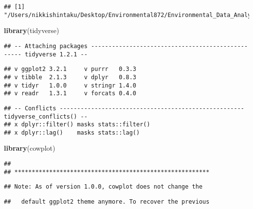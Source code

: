 \documentclass[]{article}
\newenvironment{Shaded}{\begin{snugshade}}{\end{snugshade}}
\newcommand{\CommentTok}[1]{\textcolor[rgb]{0.56,0.35,0.01}{\textit{#1}}}
\newcommand{\KeywordTok}[1]{\textcolor[rgb]{0.13,0.29,0.53}{\textbf{#1}}}
\newcommand{\NormalTok}[1]{#1}
\begin{document}
\begin{Shaded}
\end{Shaded}

\begin{verbatim}
## [1] "/Users/nikkishintaku/Desktop/Environmental872/Environmental_Data_Analytics_2020"
\end{verbatim}

\begin{Shaded}
\begin{Highlighting}[]
\KeywordTok{library}\NormalTok{(tidyverse)}
\end{Highlighting}
\end{Shaded}

\begin{verbatim}
## -- Attaching packages -------------------------------------------------- tidyverse 1.2.1 --
\end{verbatim}

\begin{verbatim}
## v ggplot2 3.2.1     v purrr   0.3.3
## v tibble  2.1.3     v dplyr   0.8.3
## v tidyr   1.0.0     v stringr 1.4.0
## v readr   1.3.1     v forcats 0.4.0
\end{verbatim}

\begin{verbatim}
## -- Conflicts ----------------------------------------------------- tidyverse_conflicts() --
## x dplyr::filter() masks stats::filter()
## x dplyr::lag()    masks stats::lag()
\end{verbatim}

\begin{Shaded}
\begin{Highlighting}[]
\KeywordTok{library}\NormalTok{(cowplot)}
\end{Highlighting}
\end{Shaded}

\begin{verbatim}
## 
## ********************************************************
\end{verbatim}

\begin{verbatim}
## Note: As of version 1.0.0, cowplot does not change the
\end{verbatim}

\begin{verbatim}
##   default ggplot2 theme anymore. To recover the previous
\end{verbatim}
\end{document}
